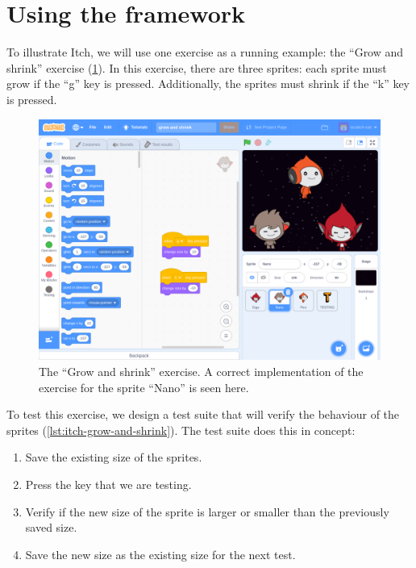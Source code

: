 \documentclass[../main]{subfiles}
\begin{document}
\section{Using the framework}\label{sec:itch-using-the-framework}

To illustrate Itch, we will use one exercise as a running example: the ``Grow and shrink'' exercise (\cref{fig:itch-grow-shrink-code}).
In this exercise, there are three sprites: each sprite must grow if the ``g'' key is pressed.
Additionally, the sprites must shrink if the ``k'' key is pressed.

\begin{figure}
    \centering
    \includegraphics{itch-grow-and-shrink-code}
    \caption{The ``Grow and shrink'' exercise. A correct implementation of the exercise for the sprite ``Nano'' is seen here.}
    \label{fig:itch-grow-shrink-code}
\end{figure}

To test this exercise, we design a test suite that will verify the behaviour of the sprites (\cref{lst:itch-grow-and-shrink}).
The test suite does this in concept:

\begin{enumerate}[noitemsep]
    \item Save the existing size of the sprites.
    \item Press the key that we are testing.
    \item Verify if the new size of the sprite is larger or smaller than the previously saved size.
    \item Save the new size as the existing size for the next test.
\end{enumerate}
\end{document}
